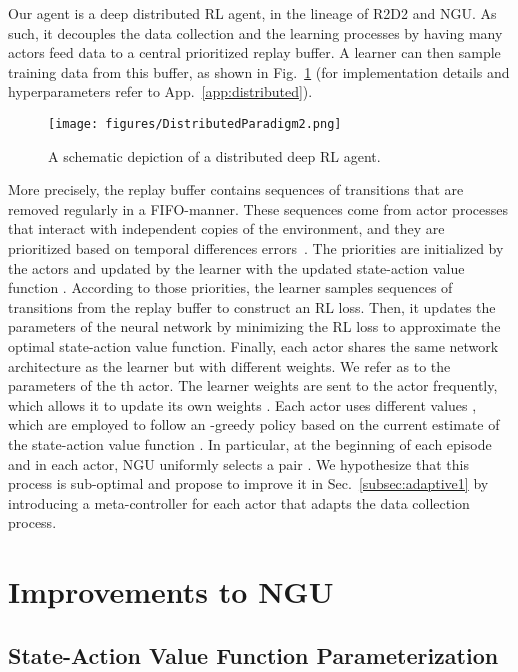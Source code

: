 \documentclass{article}
\begin{document}
Our agent is a deep distributed RL agent, in the lineage of R2D2 and NGU. As such, it decouples the data collection and the learning processes by having many actors feed data to a central prioritized replay buffer. A learner can then sample training data from this buffer, as shown in Fig.~\ref{fig:distributed} (for implementation details and hyperparameters refer to App.~\ref{app:distributed}). 
\begin{figure}[!ht]
    \centering
    \texttt{[image: figures/DistributedParadigm2.png]}
    \caption{A schematic depiction of a distributed deep RL agent.} 
    \label{fig:distributed}
\end{figure}
More precisely, the replay buffer contains sequences of transitions that are removed regularly in a FIFO-manner. These sequences come from actor processes that interact with independent copies of the environment, and they are prioritized based on temporal differences errors~\citep{kapturowski2018recurrent}. The priorities are initialized by the actors and updated by the learner with the updated state-action value function . According to those priorities, the learner samples sequences of transitions from the replay buffer to construct an RL loss. Then, it updates the parameters of the neural network  by minimizing the RL loss to approximate the optimal state-action value function. Finally, each actor shares the same network architecture as the learner but with different weights. We refer as  to the parameters of the th actor. The learner weights  are sent to the actor frequently, which allows it to update its own weights . Each actor uses different values , which are employed to follow an -greedy policy based on the current estimate of the state-action value function . In particular, at the beginning of each episode and in each actor, NGU uniformly selects a pair . We hypothesize that this process is sub-optimal and propose to improve it in Sec.~\ref{subsec:adaptive1} by introducing a meta-controller for each actor that adapts the data collection process. 

\section{Improvements to NGU}
\label{sec:improvments}

\subsection{State-Action Value Function Parameterization}
\label{subsec:value1}
\end{document}

